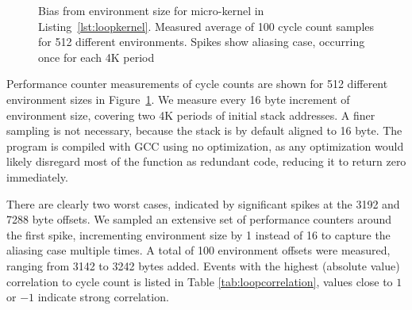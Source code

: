 \documentclass[a4paper,10pt,twocolumn,twoside]{article}
\begin{document}
\begin{figure}[t]
  \caption{Bias from environment size for micro-kernel in Listing~\ref{lst:loopkernel}. Measured average of 100 cycle count samples for 512 different environments. Spikes show aliasing case, occurring once for each 4K period}
  \label{fig:envbias}
\end{figure}

Performance counter measurements of cycle counts are shown for 512 different environment sizes in Figure~\ref{fig:envbias}.
We measure every 16 byte increment of environment size, covering two 4K periods of initial stack addresses.
A finer sampling is not necessary, because the stack is by default aligned to 16 byte.
The program is compiled with \small{GCC} using no optimization, as any optimization would likely disregard most of the function as redundant code, reducing it to return zero immediately.

There are clearly two worst cases, indicated by significant spikes at the 3192 and 7288 byte offsets.
We sampled an extensive set of performance counters around the first spike, incrementing environment size by 1 instead of 16 to capture the aliasing case multiple times.
A total of 100 environment offsets were measured, ranging from 3142 to 3242 bytes added.
Events with the highest (absolute value) correlation to cycle count is listed in Table \ref{tab:loopcorrelation}, values close to $1$ or $-1$ indicate strong correlation.
\end{document}
